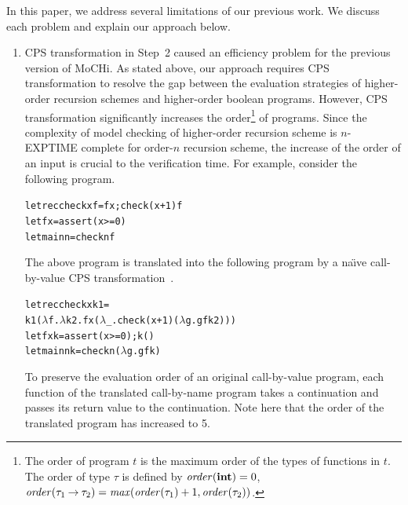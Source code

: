 In this paper, we address several limitations of our previous work.
We discuss each problem and explain our approach below.

\vspace{-5pt}
\begin{enumerate}
\item CPS transformation in Step~2 caused an
      efficiency problem for the previous version of MoCHi.  As stated
      above, our approach requires CPS transformation to resolve the gap
      between the evaluation strategies of higher-order recursion
      schemes and higher-order boolean programs.  However, CPS
      transformation significantly 
    increases the order\footnote{The order of program
      $t$ is the maximum order of the types of functions in $t$.  The
      order of type $\tau$ is defined by $\mathit{order}(\mathbf{int})=0$,
      $\mathit{order}({\tau_1}\mathbin{\rightarrow}{\tau_2}) =
      \mathit{max}(\mathit{order}(\tau_1)+1, \mathit{order}(\tau_2))$.}
      of programs.
   Since the complexity of model checking of higher-order
      recursion scheme is $n$-EXPTIME complete for order-$n$ recursion
      scheme, the increase of the order of an input is crucial to the
      verification time.
%
      For example, consider the following program.
\vspace*{-5pt}
\begin{alltt}
 letrec check x f = f x; check (x+1) f
 let f x = assert (x >= 0)
 let main n = check n f
\end{alltt}
\vspace*{-5pt}
      The above program is translated into the following program by
      a na\"{\i}ve call-by-value CPS transformation~\cite{Plotkin1975}.
\vspace*{-5pt}
\begin{alltt}
 letrec check x k1 =
   k1 (\(\lambda\)f.\(\lambda\)k2.f x (\(\lambda\)_.check (x+1) (\(\lambda\)g.g f k2)))
 let f x k = assert (x >= 0); k ()
 let main n k = check n (\(\lambda\)g. g f k)
\end{alltt}
\vspace{-5pt}
      To preserve the evaluation order of an original call-by-value program,
      each function of the translated call-by-name program takes
      a continuation and passes its return value to the continuation.  Note here that the
      order of the translated program has increased to 5.

\end{enumerate}
